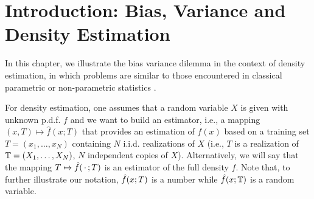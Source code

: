 


\chapter[Introduction: Bias and Variance]{Introduction: Bias, Variance and Density Estimation}
\label{chap:intro}



In this chapter, we illustrate the bias variance dilemma in the context of density estimation, in which problems are similar to those  encountered in classical parametric or non-parametric statistics \citep{rao1983nonparametric,dgl96,pons2011functional}. 

For density estimation, one assumes that a random variable $X$ is given with unknown p.d.f. $f$ and we want to build an estimator, i.e., a mapping $(x, T) \mapsto \hat f(x;T)$ that provides an estimation of $f(x)$ based on a training set $T = (x_1, \ldots, x_N)$ containing $N$ i.i.d. realizations of $X$ (i.e., $T$ is a realization of ${\mathbb T} = (X_1, \ldots, X_N)$, $N$ independent copies of $X$). Alternatively, we will say that the mapping $T \mapsto {\hat{f}}(\,\cdot\,; T)$ is an estimator of the full density $f$. Note that, to further illustrate our notation, ${\hat{f}}(x;T)$ is a number while ${\hat{f}}(x; {\mathbb T})$ is a random variable.



